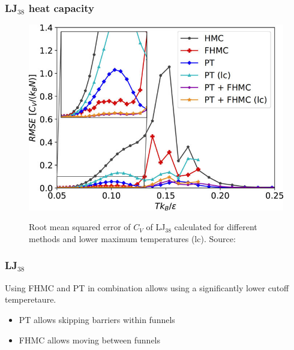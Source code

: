 \documentclass{beamer}
\begin{document}
	\begin{frame}
		\frametitle{LJ$_{38}$ heat capacity} %
		\begin{figure}
			\center
			\includegraphics[height=0.8\textheight]{figures/LJ38_rmse.jpeg}
			\label{fig:LJ38_rmse}
			\caption{Root mean squared error of $C_V$ of LJ$_{38}$ calculated for different methods and lower maximum temperatures (lc). Source: \cite{Finkler2020}}
		\end{figure}	
	\end{frame}

	\begin{frame}
		\frametitle{LJ$_{38}$}
		Using FHMC and PT in combination allows using a significantly lower cutoff temperetaure.
		\begin{itemize}
			\item PT allows skipping barriers within funnels
			\item FHMC allows moving between funnels
		\end{itemize}
	\end{frame}
\end{document}
